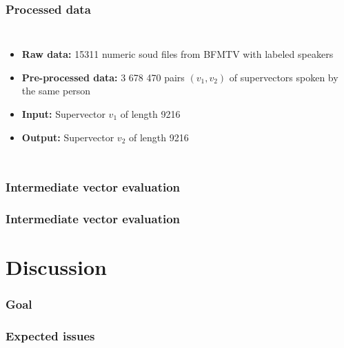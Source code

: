 \documentclass[11pt,english]{beamer}
\begin{document}
\begin{frame}
  \frametitle{Processed data}

  \begin{columns}
    \begin{itemize}
\setlength\itemsep{2em}
    \item \textbf{Raw data:} 15311 numeric soud files from BFMTV with labeled speakers
    \item \textbf{Pre-processed data:} 3 678 470 pairs $(v_1,v_2)$ of supervectors
      spoken by the same person
    \item \textbf{Input:} Supervector $v_1$ of length 9216
    \item \textbf{Output:} Supervector $v_2$ of length 9216

    \end{itemize}

  \end{columns}
  
\end{frame}

\begin{frame}
  \frametitle{Intermediate vector evaluation}
  
\end{frame}

\begin{frame}
  \frametitle{Intermediate vector evaluation}
  
\end{frame}

\section{Discussion}

\begin{frame}
  \frametitle{Goal}
  
\end{frame}

\begin{frame}
  \frametitle{Expected issues}
  
\end{frame}
\end{document}
